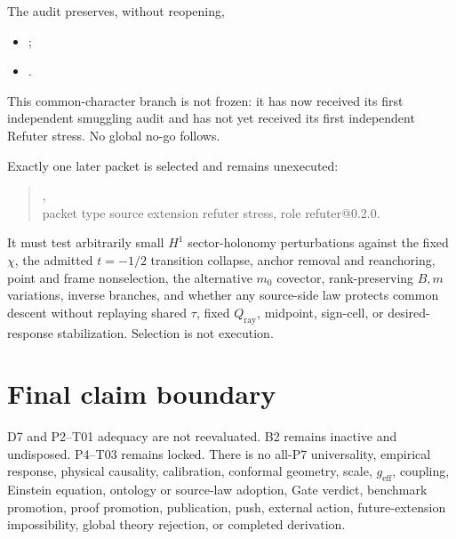 \documentclass[11pt]{article}
\newcommand{\status}[1]{\textsf{#1}}
\begin{document}
The audit preserves, without reopening,
\begin{itemize}
\item \small{};
\item \small{}.
\end{itemize}
This common-character branch is not frozen: it has now received its first
independent smuggling audit and has not yet received its first independent
Refuter stress.  No global no-go follows.

Exactly one later packet is selected and remains unexecuted:
\begin{quote}
\small{},\\
packet type \status{source extension refuter stress}, role
\status{refuter@0.2.0}.
\end{quote}
It must test arbitrarily small $H^1$ sector-holonomy perturbations against the
fixed $\chi$, the admitted $t=-1/2$ transition collapse, anchor removal and
reanchoring, point and frame nonselection, the alternative $m_0$ covector,
rank-preserving $B,m$ variations, inverse branches, and whether any source-side
law protects common descent without replaying shared $\tau$, fixed
$Q_{\mathrm{ray}}$, midpoint, sign-cell, or desired-response stabilization.
Selection is not execution.

\section{Final claim boundary}

D7 and P2--T01 adequacy are not reevaluated.  B2 remains inactive and
undisposed.  P4--T03 remains locked.  There is no all-P7 universality, empirical
response, physical causality, calibration, conformal geometry, scale,
$g_{\mathrm{eff}}$, coupling, Einstein equation, ontology or source-law
adoption, Gate verdict, benchmark promotion, proof promotion, publication,
push, external action, future-extension impossibility, global theory rejection,
or completed derivation.
\end{document}
